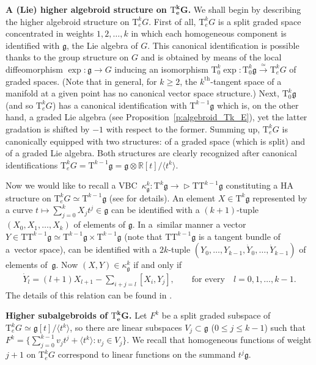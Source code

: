 \documentclass[pdftex]{sigma}
\newcommand{\ZM}{{VBC}} %
\newcommand{\thh}[1]{#1^{\mathrm{th}}} %
\newcommand{\R}{\mathbb{R}}
\newcommand{\ideal}[1]{\langle {#1} \rangle}
\newcommand{\ra}{\rightarrow}
\newcommand{\T}{\mathrm{T}} %
\newcommand{\TT}[1]{\mathrm{T}^{#1}} %
\newcommand{\g}{\mathfrak{g}} %
\def\relto{\rightarrow\!\!\vartriangleright} %
\numberwithin{equation}{section}
\theoremstyle{definition}
\begin{document}
{\bf A (Lie) higher algebroid structure on $\boldsymbol{\TT{k}_eG}$.}
 We shall begin by describing the higher algebroid structure on $\TT{k}_eG$. First of all, $\TT{k}_e G$ is a split graded space concentrated in weights $1,2, \ldots, k$ in which each homogeneous component is identified with $\g$, the Lie algebra of $G$. This canonical identification is possible thanks to the group structure on $G$ and is obtained by means of the local diffeomorphism $\exp\colon \g\ra G$ inducing an isomorphism $\TT{k}_0 \exp\colon \TT{k}_0\g \xrightarrow{\simeq} \TT{k}_e G$ of graded spaces. (Note that in general, for $k\geq 2$, the $\thh{k}$-tangent space of a manifold at a given point has no canonical vector space structure.) Next, $\TT{k}_0 \g$ (and so $\TT{k}_e G$) has a canonical identification with $\TT{k-1} \g$ which is, on the other hand, a graded Lie algebra (see Proposition~\ref{p:algebroid_Tk_E}), yet the latter gradation is shifted by $-1$ with respect to the former. Summing up, $\TT{k}_e G$ is canonically equipped with two structures: of a graded space (which is split) and of a graded Lie algebra. Both structures are clearly recognized after canonical identifications $\TT{k}_e G = \TT{k-1}\g = \g\otimes \R[t]/\ideal{t^k}$.

Now we would like to recall a \ZM\ $\kappa^k_\g\colon \TT{k}\g\relto \T\TT{k-1}\g$ constituting a HA structure on $\TT{k}_eG\simeq\TT{k-1}\g$ (see \cite[Section~6]{MJ_MR_models_high_alg_2015} for details). An element $X\in\TT{k}\g$ represented by a curve $t\mapsto \sum_{j=0}^k X_j t^j\in\g$ can be identified with a $(k+1)$-tuple $(X_0,X_1,\hdots,X_k)$ of elements of $\g$. In a~similar manner a vector $Y \in \T \TT{k-1} \g\simeq \TT{k-1}\g\times\TT{k-1}\g$ (note that $\T\TT{k-1}\g$ is a tangent bundle of a~vector space), can be identified with a $2k$-tuple $(Y_0,\hdots,Y_{k-1},\dot Y_0,\hdots,\dot Y_{k-1})$ of elements of~$\g$. Now $(X,Y)\in\kappa^k_\g$ if and only if
\begin{gather}\label{eqn:kappa_l_GG_expd}
\dot Y_{l} = (l+1) X_{l+1} - \sum_{i+j=l} [X_i, Y_j],\qquad\text{for every} \quad l=0,1,\hdots,k-1.
\end{gather}
The details of this relation can be found in \cite[Proposition~6.3]{MJ_MR_models_high_alg_2015}.

{\bf Higher subalgebroids of $\boldsymbol{\TT{k}_e G}$.} Let $F^k$ be a split graded subspace of $\T_e^k G \simeq \g[t]/\ideal{t^k}$, so there are linear subspaces $V_j\subset \g$ ($0\leq j\leq k-1$) such that $F^k = \big\{\sum_{j=0}^{k-1} v_j t^j +\ideal{t^k}\colon v_j\in V_j\big\}$. We recall that homogeneous functions of weight $j+1$ on $\T_e^k G$ correspond to linear functions on the summand $t^j \g$.
\end{document}
